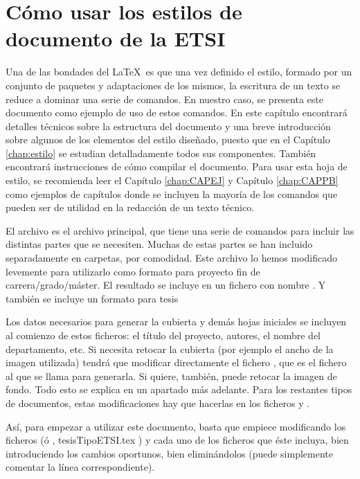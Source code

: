 \section{Cómo usar los  estilos de documento de la ETSI}\label{sec-00}

Una de las bondades del \LaTeX\ es que una vez definido el estilo, formado por un conjunto de paquetes y adaptaciones de los mismos, la escritura de un texto se reduce a dominar una serie de comandos. En nuestro caso, se presenta este documento como ejemplo de uso de estos comandos. En este capítulo encontrará detalles técnicos sobre la estructura del documento y una breve introducción sobre algunos de los elementos del estilo diseñado, puesto que en el Capítulo \ref{chap:estilo} se estudian detalladamente todos sus componentes. También encontrará instrucciones de cómo compilar el documento. Para usar esta hoja de estilo, se recomienda leer el Capítulo \ref{chap:CAPEJ} y Capítulo \ref{chap:CAPPB} como ejemplos de capítulos donde se incluyen la mayoría de los comandos que pueden ser de utilidad en la redacción de un texto técnico. 

El archivo  es el archivo principal, que tiene una serie de comandos para incluir las distintas partes que se necesiten. Muchas de estas partes se han incluido separadamente en carpetas, por comodidad. Este archivo lo hemos modificado levemente para utilizarlo como formato para proyecto fin de carrera/grado/máster. El resultado se incluye en un fichero con nombre . Y también se incluye un formato para tesis 

Los datos necesarios para generar la cubierta y demás hojas iniciales se incluyen al comienzo de estos ficheros: el título del proyecto, autores, el nombre del departamento, etc. Si necesita retocar la cubierta  (por ejemplo el ancho de la imagen utilizada)  tendrá que modificar directamente el fichero , que es el fichero al que se llama para generarla. Si quiere, también, puede retocar la imagen de fondo. Todo esto se explica en un apartado más adelante. Para los restantes tipos de documentos, estas modificaciones hay que hacerlas en los ficheros  y .

Así, para empezar a utilizar este documento, basta que empiece modificando los ficheros  (ó , {tesisTipoETSI.tex} ) y cada uno de los ficheros que éste incluya, bien introduciendo los cambios oportunos, bien eliminándolos (puede simplemente comentar la línea correspondiente).

